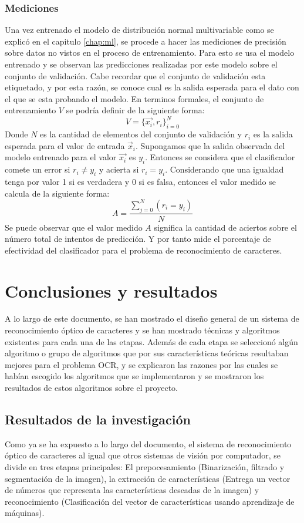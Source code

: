 \documentclass[a4paper, 11pt, oneside]{report}
\begin{document}
\subsection{Mediciones}

Una vez entrenado el modelo de distribución normal multivariable como se explicó en el capitulo \ref{chap:ml}, se procede a hacer las mediciones de precisión sobre datos no vistos en el proceso de entrenamiento. Para esto se usa el modelo entrenado y se observan las predicciones realizadas por este modelo sobre el conjunto de validación. Cabe recordar que el conjunto de validación esta etiquetado, y por esta razón, se conoce cual es la salida esperada para el dato con el que se esta probando el modelo. En terminos formales, el conjunto de entrenamiento $V$ se podría definir de la siguiente forma:
\[ V = \{\vec{x_i},r_i\}_{i=0}^N \]
Donde $N$ es la cantidad de elementos del conjunto de validación y $r_i$ es la salida esperada para el valor de entrada $\vec{x}_i$. Supongamos que la salida observada del modelo entrenado para el valor $\vec{x_i}$ es $y_i$. Entonces se considera que el clasificador comete un error si $r_i \ne y_i$ y acierta si $r_i = y_i$. Considerando que una igualdad tenga por valor 1 si es verdadera y 0 si es falsa, entonces el valor medido se calcula de la siguiente forma:
\[ A = \frac{ \sum_{j=0}^{N}(r_i=y_i) }{N} \]
Se puede observar que el valor medido $A$ significa la cantidad de aciertos sobre el número total de intentos de predicción. Y por tanto mide el porcentaje de efectividad del clasificador para el problema de reconocimiento de caracteres.

\chapter{Conclusiones y resultados}
\label{chap:results}
A lo largo de este documento, se han mostrado el diseño general de un sistema de reconocimiento óptico de caracteres y se han mostrado técnicas y algoritmos existentes para cada una de las etapas. Además de cada etapa se seleccionó algún algoritmo o grupo de algoritmos que por sus características teóricas resultaban mejores para el problema OCR, y se explicaron las razones por las cuales se habían escogido los algoritmos que se implementaron y se mostraron los resultados de estos algoritmos sobre el proyecto.

\section{Resultados de la investigación}
Como ya se ha expuesto a lo largo del documento, el sistema de reconocimiento óptico de caracteres al igual que otros sistemas de visión por computador, se divide en tres etapas principales: El prepocesamiento (Binarización, filtrado y segmentación de la imagen), la extracción de características (Entrega un vector de números que representa las características deseadas de la imagen) y reconocimiento (Clasificación del vector de características usando aprendizaje de máquinas).
\end{document}
